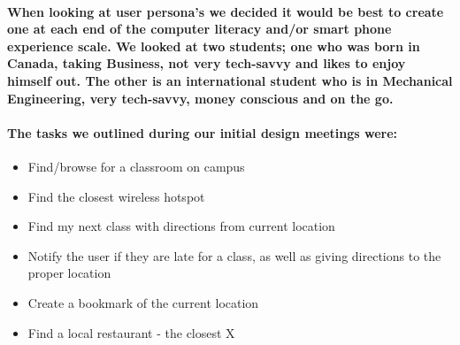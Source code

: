 \documentclass{report}
\begin{document}
    \paragraph{When looking at user persona's we decided it would be best to
    create one at each end of the computer literacy and/or smart phone experience
    scale. We looked at two students; one who was born in Canada, taking Business,
    not very tech-savvy and likes to enjoy himself out. The other is an
    international student who is in Mechanical Engineering, very tech-savvy, money
    conscious and on the go.}
    \paragraph{The tasks we outlined during our initial design meetings were:}
    \begin{itemize}
    \item Find/browse for a classroom on campus
    \item Find the closest wireless hotspot
    \item Find my next class with directions from current location
    \item Notify the user if they are late for a class, as well as giving directions to
    the proper location
    \item Create a bookmark of the current location
    \item Find a local restaurant - the closest X
    \end{itemize}
\end{document}
